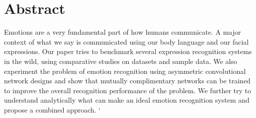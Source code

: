 \section{Abstract}
Emotions are a very fundamental part of how humans communicate. A major context of what we say is communicated using our body language and our facial expressions. Our paper tries to benchmark several expression recognition systems in the wild, using comparative studies on datasets and sample data. We also experiment the problem of emotion recognition using asymmetric convolutional network designs and show that mutually complimentary networks can be trained to improve the overall recognition performance of the problem. We further try to understand analytically what can make an ideal emotion recognition system and propose a combined approach. `